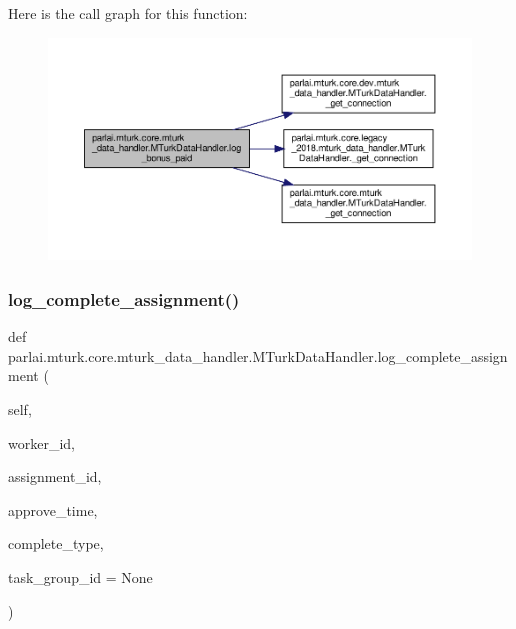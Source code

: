 Here is the call graph for this function\+:
\nopagebreak
\begin{figure}[H]
\begin{center}
\leavevmode
\includegraphics[width=350pt]{classparlai_1_1mturk_1_1core_1_1mturk__data__handler_1_1MTurkDataHandler_af62327d533f06297786cd37c8833289a_cgraph}
\end{center}
\end{figure}
\mbox{\label{classparlai_1_1mturk_1_1core_1_1mturk__data__handler_1_1MTurkDataHandler_a78a1aacc3cce8b8afd0153ad68c09baf}} 
\subsubsection{\texorpdfstring{log\+\_\+complete\+\_\+assignment()}{log\_complete\_assignment()}}
{\footnotesize\ttfamily def parlai.\+mturk.\+core.\+mturk\+\_\+data\+\_\+handler.\+M\+Turk\+Data\+Handler.\+log\+\_\+complete\+\_\+assignment (\begin{DoxyParamCaption}\item[{}]{self,  }\item[{}]{worker\+\_\+id,  }\item[{}]{assignment\+\_\+id,  }\item[{}]{approve\+\_\+time,  }\item[{}]{complete\+\_\+type,  }\item[{}]{task\+\_\+group\+\_\+id = {\ttfamily None} }\end{DoxyParamCaption})}

